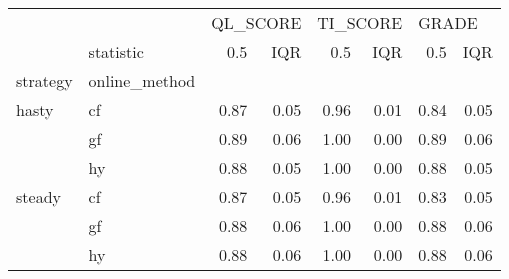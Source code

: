 \begin{tabular}{llrrrrrr}
\toprule
       & {} & \multicolumn{2}{l}{QL\_SCORE} & \multicolumn{2}{l}{TI\_SCORE} & \multicolumn{2}{l}{GRADE} \\
       & statistic &      0.5 &  IQR &      0.5 &  IQR &   0.5 &  IQR \\
strategy & online\_method &          &      &          &      &       &      \\
\midrule
hasty & cf &     0.87 & 0.05 &     0.96 & 0.01 &  0.84 & 0.05 \\
       & gf &     0.89 & 0.06 &     1.00 & 0.00 &  0.89 & 0.06 \\
       & hy &     0.88 & 0.05 &     1.00 & 0.00 &  0.88 & 0.05 \\
steady & cf &     0.87 & 0.05 &     0.96 & 0.01 &  0.83 & 0.05 \\
       & gf &     0.88 & 0.06 &     1.00 & 0.00 &  0.88 & 0.06 \\
       & hy &     0.88 & 0.06 &     1.00 & 0.00 &  0.88 & 0.06 \\
\bottomrule
\end{tabular}
